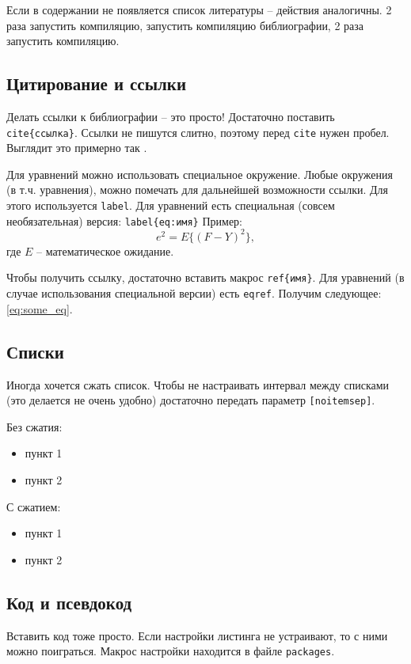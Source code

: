 Если в содержании не появляется список литературы -- действия аналогичны. 2 раза запустить компиляцию, запустить компиляцию библиографии, 2 раза запустить компиляцию.


\subsection{Цитирование и ссылки}
Делать ссылки к библиографии -- это просто! Достаточно поставить \texttt{\\cite\{ссылка\}}. Ссылки не пишутся слитно, поэтому перед \texttt{cite} нужен пробел. Выглядит это примерно так \cite{test}.

Для уравнений можно использовать специальное окружение. Любые окружения (в т.ч. уравнения), можно помечать для дальнейшей возможности ссылки. Для этого используется \texttt{label}. Для уравнений есть специальная (совсем необязательная) версия: \texttt{label\{eq:имя\}} Пример:
\begin{equation}\label{eq:some_eq}
	e^2 = E\{(F - Y)^2\},
\end{equation}
где $E$ -- математическое ожидание.

Чтобы получить ссылку, достаточно вставить макрос \texttt{ref\{имя\}}. Для уравнений (в случае использования специальной версии) есть \texttt{eqref}. Получим следующее: \eqref{eq:some_eq}.

\subsection{Списки}
Иногда хочется сжать список. Чтобы не настраивать интервал между списками (это делается не очень удобно) достаточно передать параметр \texttt{[noitemsep]}.

Без сжатия:
\begin{itemize}
    \item пункт 1
    \item пункт 2
\end{itemize}

С сжатием:
\begin{itemize}[noitemsep]
    \item пункт 1
    \item пункт 2
\end{itemize}

\subsection{Код и псевдокод}
Вставить код тоже просто. Если настройки листинга не устраивают, то с ними можно поиграться. Макрос настройки находится в файле \texttt{packages}.

